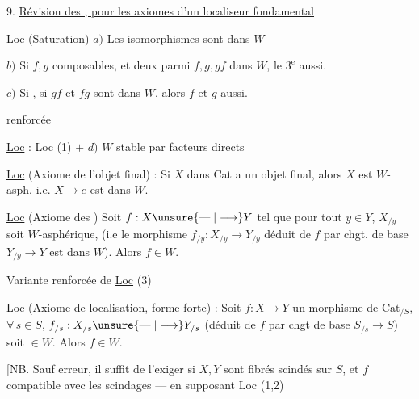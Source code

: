 

9. \uline{Révision des , pour les axiomes d'un localiseur fondamental}

\uline{Loc}  (Saturation) \quad $a)$ Les  isomorphismes sont dans $W$

$b)$ Si $f,g$ composables, et deux parmi $f,g,gf$ dans $W$, le $3^\mathrm{e}$ aussi.

$c)$ Si
,
si $gf$ et $fg$ sont dans $W$, alors $f$ et $g$ aussi.

 renforcée

\uline{Loc}  : Loc (1) $+$ \quad $d)$ $W$ stable par facteurs directs

\uline{Loc}  (Axiome de l'objet final) : Si $X$ dans Cat a un objet final, alors $X$ est $W$-asph. i.e. $X\longrightarrow e$ est dans $W$.

\uline{Loc}  (Axiome des  ) Soit $f:X\unsure{\mathrel{\text{---}}|\longrightarrow}Y$ tel que pour tout $y\in Y$, $X_{/y}$ soit $W$-asphérique, (i.e le morphisme $f_{/y}:X_{/y}\longrightarrow Y_{/y}$ déduit de $f$ par chgt. de base $Y_{/y}\longrightarrow Y$ est dans $W$). Alors $f\in W$.

Variante renforcée de \uline{Loc} (3)

\uline{Loc}  (Axiome de localisation, forme forte) : Soit $f:X\longrightarrow Y$ un morphisme de $\mathrm{Cat}_{/S}$,   $\forall\,s\in S$, $f_{/s}:X_{/s}\unsure{\mathrel{\text{---}}|\longrightarrow}Y_{/s}$ (déduit de $f$ par chgt de base $S_{/s}\longrightarrow S$) soit $\in W$. Alors $f\in W$.

[NB. Sauf erreur, il suffit de l'exiger si $X,Y$ sont  fibrés scindés sur $S$, et $f$  compatible avec les scindages --- en supposant Loc (1,2)

